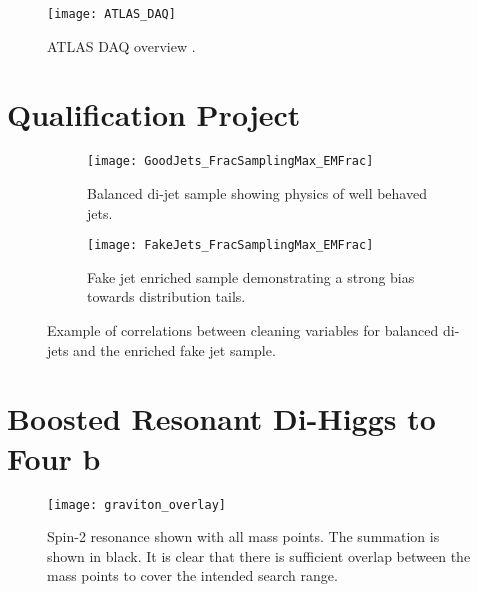 \documentclass[12pt]{article}
\begin{document}
\begin{figure}[t]
    \centering
    \texttt{[image: ATLAS\_DAQ]}
    \caption{ATLAS DAQ overview \cite{Aad_2024}.}
    \label{fig:daq_schematic}
\end{figure}


\clearpage
\newpage
\section{Qualification Project}
\begin{figure}[h]
    \centering
    \begin{subfigure}[t]{.48\textwidth}
        \centering
        \texttt{[image: GoodJets\_FracSamplingMax\_EMFrac]}
        \caption{Balanced di-jet sample showing physics of well behaved jets.}
        \label{subfig:good_jets_th2}
    \end{subfigure}
    \hfill
    \begin{subfigure}[t]{.48\textwidth}
        \centering
        \texttt{[image: FakeJets\_FracSamplingMax\_EMFrac]}
        \caption{Fake jet enriched sample demonstrating a strong bias towards
        distribution tails.}
        \label{subfig:fake_jets_th2}
    \end{subfigure}
    \caption{Example of correlations between cleaning variables for balanced
    di-jets and the enriched fake jet sample.}
\label{fig:cleaning_variables}
\end{figure}

\section{Boosted Resonant Di-Higgs to Four b}
\begin{figure}[h]
    \centering
    \texttt{[image: graviton\_overlay]}
    \caption{Spin-2 resonance shown with all mass points. The summation is shown
    in black. It is clear that there is sufficient overlap between the mass
    points to cover the intended search range.}
    \label{fig:graviton_overlay}
\end{figure}
\end{document}
